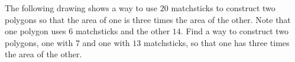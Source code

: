 The following drawing shows a way to use $20$ matchsticks to construct two polygons so that the area of one is three times the area of the other. Note that one polygon uses 6 matchsticks and the other $14$. Find a way to construct two polygons, one with $7$ and one with $13$ matchsticks, so that one has three times the area of the other.
